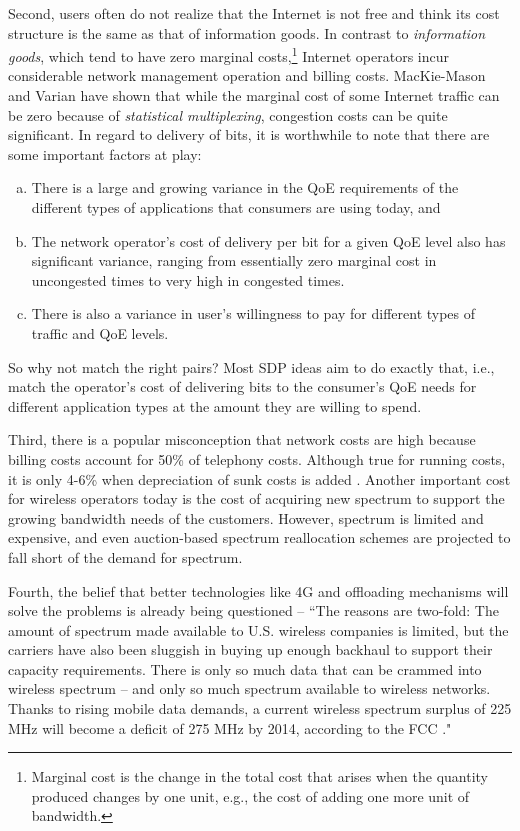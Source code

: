 Second, users often do not realize that the Internet is not free \cite{MIT, chetty2011my} and think its cost structure is the same as that of information goods. In contrast to \emph{information goods}, which tend to have zero marginal costs,\footnote{Marginal cost is the change in the total cost that arises when the quantity produced changes by one unit, e.g., the cost of adding one more unit of bandwidth.} Internet operators incur considerable network management operation and billing costs. MacKie-Mason and Varian \cite{MM-Varian} have shown that while the marginal cost of some Internet traffic can be zero because of \emph{statistical multiplexing}, congestion costs can be quite significant. 
In regard to delivery of bits, it is worthwhile to note that there are some important factors at play: 
\begin{enumerate}[(a)]
\item There is a large and growing variance in the QoE requirements of the different types of applications that consumers are using today, and
\item The network operator's cost of delivery per bit for a given QoE level also has significant variance, ranging from essentially zero marginal cost in uncongested times to very high in congested times.
\item There is also a variance in user's willingness to pay for different types of traffic and QoE levels.
\end{enumerate}

So why not match the right pairs? Most SDP ideas aim to do exactly that, i.e., match the operator's cost of delivering bits to the consumer's QoE needs for different application types at the amount they are willing to spend.

Third, there is a popular misconception that network costs are high because billing costs account for 50\% of telephony costs. Although true for running costs, it is only 4-6\% when depreciation of sunk costs is added \cite{M3I}. Another important cost for wireless operators today is the cost of acquiring new spectrum to support the growing bandwidth needs of the customers. However, spectrum is limited and expensive, and even auction-based spectrum reallocation schemes are projected to fall short of the demand for spectrum. 

Fourth, the belief that better technologies like 4G and offloading mechanisms will solve the problems is already being questioned -- ``The reasons are two-fold: The amount of spectrum made available to U.S. wireless companies is limited, but the carriers have also been sluggish in buying up enough backhaul to support their capacity requirements. There is only so much data that can be crammed into wireless spectrum -- and only so much spectrum available to wireless networks. Thanks to rising mobile data demands, a current wireless spectrum surplus of 225 MHz will become a deficit of 275 MHz by 2014, according to the FCC \cite{CNN-4G}."

